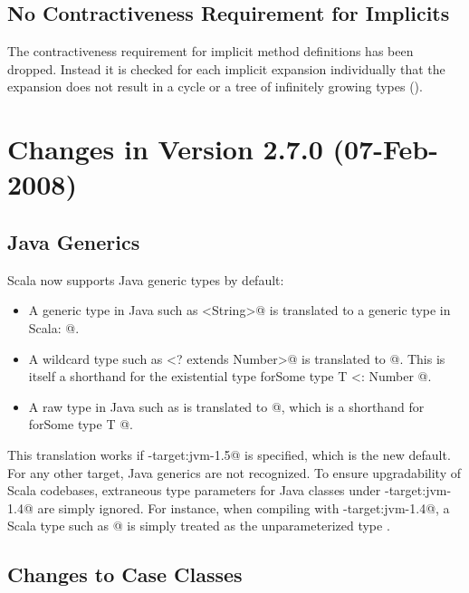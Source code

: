 \subsection*{No Contractiveness Requirement for Implicits}

The contractiveness requirement for implicit method definitions has
been dropped. Instead it is checked for each implicit expansion
individually that the expansion does not result in a cycle or a tree
of infinitely growing types ().

\section*{Changes in Version 2.7.0 (07-Feb-2008)}

\subsection*{Java Generics}

Scala now supports Java generic types by default:
\begin{itemize}
\item
A generic type in Java such as \lstinline@ArrayList<String>@ is translated to
a generic type in Scala: \lstinline@ArrayList[String]@.
\item
A wildcard type such as \lstinline@ArrayList<? extends Number>@ is translated
to \lstinline@ArrayList[_ <: Number]@. This is itself a shorthand
for the existential type \lstinline@ArrayList[T] forSome { type T <: Number }@.
\item
A raw type in Java such as \lstinline@ArrayList@ is translated to
\lstinline@ArrayList[_]@,
which is a shorthand for \lstinline@ArrayList[T] forSome { type T }@.
\end{itemize}

This translation works if \lstinline@-target:jvm-1.5@ is specified, which is
the new default. For any other target, Java generics are not
recognized. To ensure upgradability of Scala codebases, extraneous
type parameters for Java classes under \lstinline@-target:jvm-1.4@ are simply
ignored. For instance, when compiling with \lstinline@-target:jvm-1.4@, a Scala
type such as \lstinline@ArrayList[String]@ is simply treated as the
unparameterized type \lstinline@ArrayList@.

\subsection*{Changes to Case Classes}


